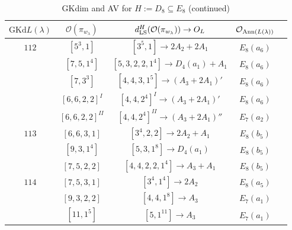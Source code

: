 \documentclass[reqno,12pt]{amsart}
\numberwithin{equation}{section}
\theoremstyle{plain}
\theoremstyle{definition}
\newcommand{\lam}{\lambda}
\renewcommand{\subset}{\subseteq}
\begin{document}
\begin{table}[htbp]\caption{GKdim and AV for $H:=D_8 \subset E_8$ (continued)}
	\label{tabd8-2}
	\centering
	\renewcommand{\arraystretch}{1.5}
	\setlength\tabcolsep{5pt}
	
	\begin{tabular}{|c|c|c|c|c|}
		\hline $\mathrm{GKd} L(\lambda)$ &  $\mathcal{O}(\pi_{w_{\lam}})$& $d_{\rm LS}^{H}(\mathcal{O}(\pi_{w_\lambda}))\rightarrow    O_{L}$ & $\mathcal{O}_{{\rm Ann}(L(\lambda))}$ \\ \hline
         
          $ 112 $    &  $ [5^3,1] $  & $[3^5,1]\rightarrow     2A_2+2A_1$     &   $ E_8(a_6)$      \\ 
         &  $ [7,5,1^4] $  & $[5,3,2,2,1^4]\rightarrow    D_4(a_1)+A_1$     &   $ E_8(a_6)$      \\
         &  $ [7,3^3] $  & $[4,4,3,1^5]\rightarrow     (A_3+2A_1)' $   &   $ E_8(a_6)$      \\
         &   $ [6,6,2,2]^I $  & $[4,4,2^4]^I\rightarrow     (A_3+2A_1)' $     &   $ E_8(a_6)$      \\
         &    $ [6,6,2,2]^{II} $  & $[4,4,2^4]^{II}\rightarrow    (A_3+2A_1)'' $     &   $ E_7(a_2)$   \\\hline 

         $ 113 $    &  $ [6, 6, 3, 1] $  & $[3^4,2,2]\rightarrow     2A_2+A_1 $     &   $ E_8(b_5)$      \\ 
          &  $ [9,3,1^4] $  & $[5,3,1^8]\rightarrow     D_4(a_1) $     &   $E_8(b_5)$      \\
          &  $ [7,5,2,2] $  & $[4,4,2,2,1^4]\rightarrow     A_3+A_1$     &   $E_8(b_5)$      \\ \hline

          $ 114 $    &  $ [7, 5, 3, 1] $  & $[3^4,1^4]\rightarrow     2A_2 $     &   $ E_8(a_5)$      \\ 
          &  $ [9,3,2,2] $  & $[4,4,1^8]\rightarrow     A_3 $     &   $E_7(a_1)$      \\
          &  $ [11,1^5] $  & $[5,1^{11}]\rightarrow     A_3$     &   $E_7(a_1)$      \\ 
          \hline
	

\end{tabular}
\end{table}
\end{document}
